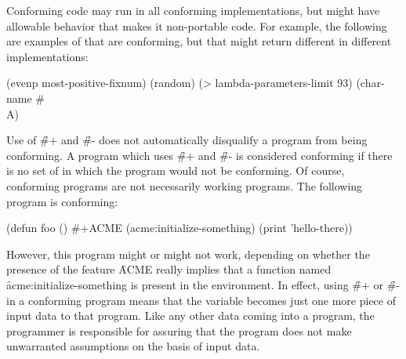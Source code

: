 
Conforming code may run in all conforming implementations, but might
have allowable  behavior that makes it
non-portable code.
For example, the following are examples of  that are conforming, but
that might return different  in different implementations:

\code
 (evenp most-positive-fixnum) \EV {}
 (random) \EV {}
 (> lambda-parameters-limit 93) \EV {}
 (char-name #\\A) \EV {}
\endcode 



Use of \f{\#+} and \f{\#-} does not automatically disqualify a program
from being conforming.  A program which uses \f{\#+} and \f{\#-} is 
considered conforming if there is no set of  in which the
program would not be conforming.  Of course, conforming programs are
not necessarily working programs.  The following program is conforming:

\code
(defun foo ()
  \#+ACME (acme:initialize-something)
  (print 'hello-there))
\endcode

However, this program might or might not work, depending on whether the
presence of the feature \f{ACME} really implies that a function named
\f{acme:initialize-something} is present in the environment.  In effect,
using \f{\#+} or \f{\#-} in a conforming program means that the variable
 becomes just one more piece of input data to that 
program.  Like any other data coming into a program, the programmer
is responsible for assuring that the program does not make unwarranted
assumptions on the basis of input data.

\endsubsubsubsection%

\endsubsubsection%

\endsubSection%
